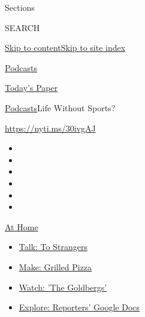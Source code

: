 Sections

SEARCH

\protect\hyperlink{site-content}{Skip to
content}\protect\hyperlink{site-index}{Skip to site index}

\href{https://www.nytimes3xbfgragh.onion/spotlight/podcasts}{Podcasts}

\href{https://myaccount.nytimes3xbfgragh.onion/auth/login?response_type=cookie\&client_id=vi}{}

\href{https://www.nytimes3xbfgragh.onion/section/todayspaper}{Today's
Paper}

\href{/spotlight/podcasts}{Podcasts}\textbar{}Life Without Sports?

\href{https://nyti.ms/30ivgAJ}{https://nyti.ms/30ivgAJ}

\begin{itemize}
\item
\item
\item
\item
\item
\item
\end{itemize}

\href{https://www.nytimes3xbfgragh.onion/spotlight/at-home?action=click\&pgtype=Article\&state=default\&region=TOP_BANNER\&context=at_home_menu}{At
Home}

\begin{itemize}
\tightlist
\item
  \href{https://www.nytimes3xbfgragh.onion/2020/08/03/well/family/the-benefits-of-talking-to-strangers.html?action=click\&pgtype=Article\&state=default\&region=TOP_BANNER\&context=at_home_menu}{Talk:
  To Strangers}
\item
  \href{https://www.nytimes3xbfgragh.onion/2020/08/01/at-home/coronavirus-make-pizza-on-a-grill.html?action=click\&pgtype=Article\&state=default\&region=TOP_BANNER\&context=at_home_menu}{Make:
  Grilled Pizza}
\item
  \href{https://www.nytimes3xbfgragh.onion/2020/07/31/arts/television/goldbergs-abc-stream.html?action=click\&pgtype=Article\&state=default\&region=TOP_BANNER\&context=at_home_menu}{Watch:
  'The Goldbergs'}
\item
  \href{https://www.nytimes3xbfgragh.onion/interactive/2020/at-home/even-more-reporters-editors-diaries-lists-recommendations.html?action=click\&pgtype=Article\&state=default\&region=TOP_BANNER\&context=at_home_menu}{Explore:
  Reporters' Google Docs}
\end{itemize}

